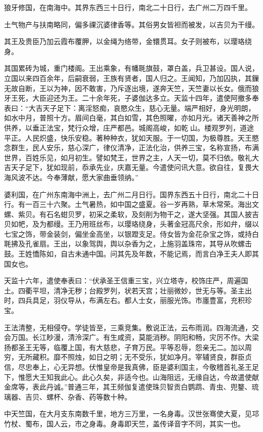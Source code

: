 \documentclass[12pt,UTF8]{ctexbook}
\begin{document}
狼牙修国，在南海中。其界东西三十日行，南北二十日行，去广州二万四千里。

土气物产与扶南略同，偏多祼沉婆律香等。其俗男女皆袒而被发，以吉贝为干缦。

其王及贵臣乃加云霞布覆胛，以金绳为络带，金镮贯耳。女子则被布，以璎珞绕身。

其国累砖为城，重门楼阁。王出乘象，有幡毦旗鼓，罩白盖，兵卫甚设。国人说，立国以来四百余年，后嗣衰弱，王族有贤者，国人归之。王闻知，乃加囚执，其鏁无故自断，王以为神，因不敢害，乃斥逐出境，遂奔天竺，天竺妻以长女。俄而狼牙王死，大臣迎还为王。二十余年死，子婆伽达多立。天监十四年，遣使阿撤多奉表曰：“大吉天子足下：离淫怒痴，哀愍众生，慈心无量。端严相好，身光明朗，如水中月，普照十方。眉间白毫，其白如雪，其色照曜，亦如月光。诸天善神之所供养，以垂正法宝，梵行众增，庄严都邑。城阁高峻，如乾山。楼观罗列，道途平正。人民炽盛，快乐安稳。著种种衣，犹如天服。于一切国，为极尊胜。天王愍念群生，民人安乐，慈心深广，律仪清净，正法化治，供养三宝，名称宣扬，布满世界，百姓乐见，如月初生。譬如梵王，世界之主，人天一切，莫不归依。敬礼大吉天子足下，犹如现前，忝承先业，庆嘉无量。今遣使问讯大意。欲自往，复畏大海风波不达。今奉薄献，愿大家曲垂领纳。”

婆利国，在广州东南海中洲上，去广州二月日行。国界东西五十日行，南北二十日行。有一百三十六聚。土气暑热，如中国之盛夏。谷一岁再熟，草木常荣。海出文螺、紫贝。有石名蚶贝罗，初采之柔软，及刻削为物干之，遂大坚强。其国人披吉贝如帊，及为都缦。王乃用班丝布，以璎珞绕身，头著金冠高尺余，形如弁，缀以七宝之饰，带金装剑，偏坐金高坐，以银蹬支足。侍女皆为金花杂宝之饰，或持白毦拂及孔雀扇。王出，以象驾舆，舆以杂香为之，上施羽盖珠帘，其导从吹螺击鼓。王姓憍陈如，自古未通中国。问其先及年数，不能记焉，而言白净王夫人即其国女也。

天监十六年，遣使奉表曰：“伏承圣王信重三宝，兴立塔寺，校饰庄严，周遍国土。四衢平坦，清净无秽；台殿罗列，状若天宫；壮丽微妙，世无与等。圣主出时，四兵具足，羽仪导从，布满左右。都人士女，丽服光饰。市廛豊富，充积珍宝。

王法清整，无相侵夺。学徒皆至，三乘竞集。敷说正法，云布雨润。四海流通，交会万国。长江眇漫，清泠深广。有生咸资，莫能消秽。阴阳和畅，灾厉不作。大梁扬都圣王无等，临覆上国，有大慈悲，子育万民。平等忍辱，怨亲无二。加以周穷，无所藏积。靡不照烛，如日之明；无不受乐，犹如净月。宰辅贤良，群臣贞信，尽忠奉上，心无异想。伏惟皇帝是我真佛，臣是婆利国主，今敬稽首礼圣王足下，惟愿大王知我此心。此心久矣，非适今也。山海阻远，无缘自达，今故遣使献金席等，表此丹诚。”普通三年，其王频伽复遣使珠贝智贡白鹦鹉、青虫、兜鍪、琉璃器、吉贝、螺杯、杂香、药等数十种。

中天竺国，在大月支东南数千里，地方三万里，一名身毒。汉世张骞使大夏，见邛竹杖、蜀布，国人云，市之身毒。身毒即天竺，盖传译音字不同，其实一也。
\end{document}
